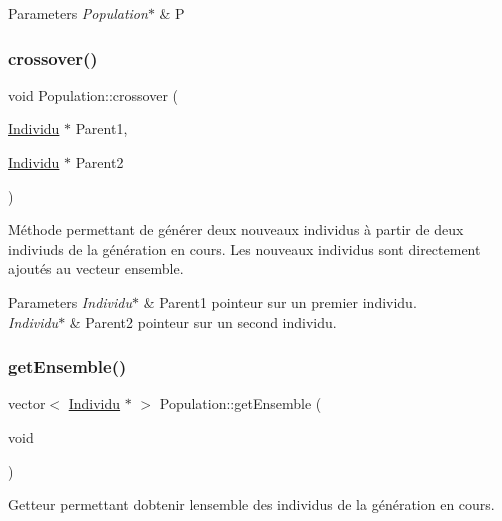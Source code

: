 \begin{DoxyParams}{Parameters}
{\em Population$\ast$} & P \\
\hline
\end{DoxyParams}
\mbox{\label{class_population_a728129af67cfe97c0fa16d0728101a28}} 
\subsubsection{\texorpdfstring{crossover()}{crossover()}}
{\footnotesize\ttfamily void Population\+::crossover (\begin{DoxyParamCaption}\item[{\hyperlink{class_individu}{Individu} $\ast$}]{Parent1,  }\item[{\hyperlink{class_individu}{Individu} $\ast$}]{Parent2 }\end{DoxyParamCaption})}



Méthode permettant de générer deux nouveaux individus à partir de deux indiviuds de la génération en cours. Les nouveaux individus sont directement ajoutés au vecteur ensemble. 


\begin{DoxyParams}{Parameters}
{\em Individu$\ast$} & Parent1 pointeur sur un premier individu. \\
\hline
{\em Individu$\ast$} & Parent2 pointeur sur un second individu. \\
\hline
\end{DoxyParams}
\mbox{\label{class_population_a2616c1ee49a009f91f36ff6a2798784b}} 
\subsubsection{\texorpdfstring{get\+Ensemble()}{getEnsemble()}}
{\footnotesize\ttfamily vector$<$ \hyperlink{class_individu}{Individu} $\ast$ $>$ Population\+::get\+Ensemble (\begin{DoxyParamCaption}\item[{void}]{ }\end{DoxyParamCaption})}



Getteur permettant d\textquotesingle{}obtenir l\textquotesingle{}ensemble des individus de la génération en cours. 


